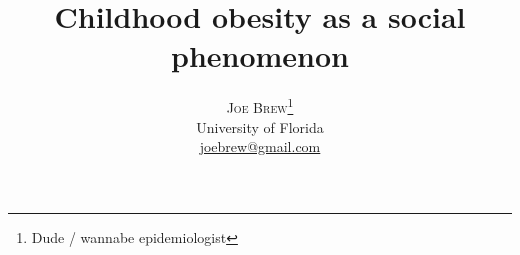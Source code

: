 \title{\vspace{-15mm}\fontsize{24pt}{10pt}\selectfont\textbf{Childhood obesity as a social phenomenon}} %

\author{
\large
\textsc{Joe Brew}\thanks{Dude / wannabe epidemiologist}\\[2mm] %
\normalsize University of Florida \\ %
\normalsize \href{mailto:joebrew@gmail.com}{joebrew@gmail.com} %
\vspace{-5mm}
}
\date{}



\maketitle %

\thispagestyle{fancy} %


% 
% 


